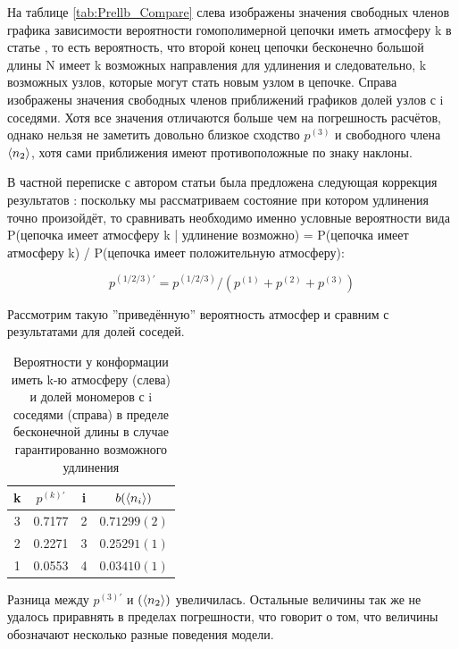 На таблице \ref{tab:Prellb_Compare} слева изображены значения свободных членов графика зависимости вероятности гомополимерной цепочки иметь атмосферу k в статье \cite{owczarek2008scaling}, то есть вероятность, что второй конец цепочки бесконечно большой длины N имеет k возможных направления для удлинения и следовательно, k возможных узлов, которые могут стать новым узлом в цепочке. Справа изображены значения свободных членов приближений графиков долей узлов с i соседями. Хотя все значения отличаются больше чем на погрешность расчётов, однако нельзя не заметить довольно близкое сходство $p^{(3)}$ и свободного члена $\langle n_{2} \rangle$, хотя сами приближения имеют противоположные по знаку наклоны. 

В частной переписке с автором статьи была предложена следующая коррекция результатов \cite{web:PrellbergPrivate}: поскольку мы рассматриваем состояние при котором удлинения точно произойдёт, то сравнивать необходимо именно условные вероятности вида P({цепочка имеет атмосферу k | удлинение возможно}) = P({цепочка имеет атмосферу k}) / P({цепочка имеет положительную атмосферу}):

\begin{equation*}
    p^{(1/2/3)'} = p^{(1/2/3)} / (p^{(1)} + p^{(2)} + p^{(3)})
\end{equation*}

Рассмотрим такую ''приведённую'' вероятность атмосфер и сравним с результатами для долей соседей.

\begin{table}[h]
    \centering
    \begin{tabular}{|c|c|c|c|}
    \hline
    k & $p^{(k)'}$ & i & $b(\langle n_{i} \rangle)$ \\ \hline
    3 & 0.7177 & 2 & $0.71299(2)$ \\ \hline
    2 & 0.2271 & 3 & $0.25291(1)$ \\ \hline
    1 & 0.0553 & 4 & $0.03410(1)$\\ \hline
    \end{tabular}
    \caption{Вероятности у конформации иметь k-ю атмосферу (слева) и долей мономеров с i соседями (справа) в пределе бесконечной длины в случае гарантированно возможного удлинения}
    \label{tab:Prellb_Compare2}
\end{table}

Разница между $p^{(3)'}$ и $(\langle n_{2} \rangle)$ увеличилась. Остальные величины так же не удалось приравнять в пределах погрешности, что говорит о том, что величины обозначают несколько разные поведения модели.

